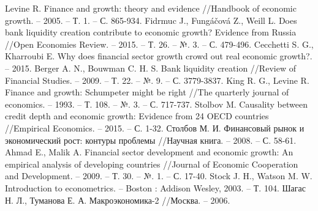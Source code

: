 \begin{thebibliography}{99}
	
	 Levine R. Finance and growth: theory and evidence //Handbook of economic growth. – 2005. – Т. 1. – С. 865-934.
		Fidrmuc J., Fungáčová Z., Weill L. Does bank liquidity creation contribute to economic growth? Evidence from Russia //Open Economies Review. – 2015. – Т. 26. – №. 3. – С. 479-496.
    	Cecchetti S. G., Kharroubi E. Why does financial sector growth crowd out real economic growth?. – 2015.
		Berger A. N., Bouwman C. H. S. Bank liquidity creation //Review of Financial Studies. – 2009. – Т. 22. – №. 9. – С. 3779-3837.
		King R. G., Levine R. Finance and growth: Schumpeter might be right //The quarterly journal of economics. – 1993. – Т. 108. – №. 3. – С. 717-737.
		Stolbov M. Causality between credit depth and economic growth: Evidence from 24 OECD countries //Empirical Economics. – 2015. – С. 1-32.
		Столбов М. И. Финансовый рынок и экономический рост: контуры проблемы //Научная книга. – 2008. – С. 58-61.
		Ahmad E., Malik A. Financial sector development and economic growth: An empirical analysis of developing countries //Journal of Economic Cooperation and Development. – 2009. – Т. 30. – №. 1. – С. 17-40.
		Stock J. H., Watson M. W. Introduction to econometrics. – Boston : Addison Wesley, 2003. – Т. 104.
		Шагас Н. Л., Туманова Е. А. Макроэкономика-2 //Москва. – 2006.
	
\end{thebibliography}